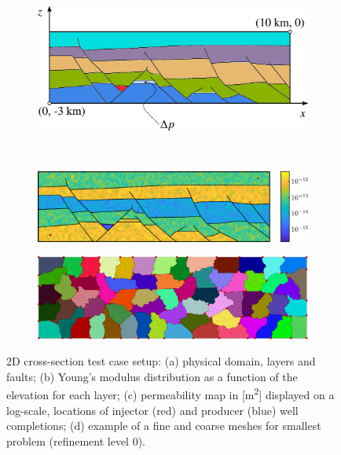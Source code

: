 \begin{figure} [htbp]
  \begin{subfigure}[t]{0.48\textwidth}
    \centering
    \includegraphics[align=b,width=\linewidth]{figs/CrossSection/sketch}
    \caption{}
    \label{fig:cross_section_sketch}
  \end{subfigure}
  \hfill
  \begin{subfigure}[t]{0.48\textwidth}
    \centering
    
    \caption{}
    \label{fig:cross_section_young}
  \end{subfigure} \\
  \begin{subfigure}[t]{0.48\textwidth}
    \centering
    \includegraphics[align=b,width=\linewidth]{figs/CrossSection/perm}
    \caption{}
    \label{fig:cross_section_perm}
  \end{subfigure}
  \hfill
  \begin{subfigure}[t]{0.48\textwidth}
    \centering
    \includegraphics[align=b,width=0.9\linewidth]{figs/CrossSection/coarse_grid}
    \caption{}
    \label{fig:cross_section_coarse_grid}
  \end{subfigure}
  \caption[2D cross-section test case setup]{2D cross-section test case setup: (a) physical domain, layers and faults; (b) Young's modulus distribution as a function of the elevation for each layer; (c) permeability map in [m\textsuperscript{2}] displayed on a log-scale, locations of injector (red) and producer (blue) well completions; (d) example of a fine and coarse meshes for smallest problem (refinement level 0).}
  \label{fig:cross_section}
\end{figure}


